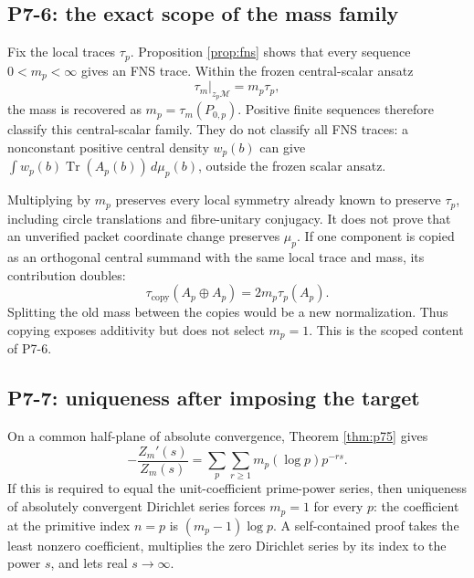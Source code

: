 \documentclass[11pt,a4paper]{article}
\theoremstyle{definition}
\newcommand{\M}{\mathcal M}
\newcommand{\Tr}{\operatorname{Tr}}
\begin{document}
\subsection{P7-6: the exact scope of the mass family}

Fix the local traces $\tau_p$.  Proposition \ref{prop:fns} shows that every
sequence $0<m_p<\infty$ gives an FNS trace.  Within the frozen central-scalar
ansatz
\begin{equation}
 \tau_m|_{z_p\M}=m_p\tau_p,
 \label{eq:central-ansatz}
\end{equation}
the mass is recovered as $m_p=\tau_m(P_{0,p})$.  Positive finite sequences
therefore classify this central-scalar family.  They do not classify all FNS
traces: a nonconstant positive central density $w_p(b)$ can give
$\int w_p(b)\Tr(A_p(b))\,d\mu_p(b)$, outside the frozen scalar ansatz.

Multiplying by $m_p$ preserves every local symmetry already known to preserve
$\tau_p$, including circle translations and fibre-unitary conjugacy.  It does
not prove that an unverified packet coordinate change preserves $\mu_p$.  If
one component is copied as an orthogonal central summand with the same local
trace and mass, its contribution doubles:
\begin{equation}
 \tau_{\mathrm{copy}}(A_p\oplus A_p)=2m_p\tau_p(A_p).
 \label{eq:copy}
\end{equation}
Splitting the old mass between the copies would be a new normalization.  Thus
copying exposes additivity but does not select $m_p=1$.  This is the scoped
content of P7-6.

\subsection{P7-7: uniqueness after imposing the target}

On a common half-plane of absolute convergence, Theorem \ref{thm:p75} gives
\begin{equation}
 -\frac{Z_m'(s)}{Z_m(s)}
 =\sum_p\sum_{r\geq1}m_p(\log p)p^{-rs}.
 \label{eq:log-derivative}
\end{equation}
If this is required to equal the unit-coefficient prime-power series, then
uniqueness of absolutely convergent Dirichlet series forces $m_p=1$ for every
$p$: the coefficient at the primitive index $n=p$ is
$(m_p-1)\log p$.  A self-contained proof takes the least nonzero coefficient,
multiplies the zero Dirichlet series by its index to the power $s$, and lets
real $s\to\infty$.
\end{document}
